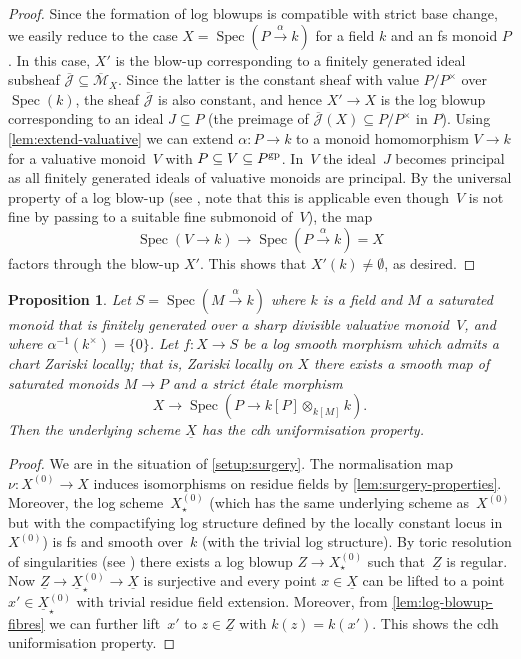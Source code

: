 \documentclass[a4paper,twoside,11pt,reqno]{amsart}
\newcommand{\cM}{{\mathcal M}}
\newcommand{\la}{\longrightarrow}
\DeclareMathOperator{\Spec}{Spec}
\newcommand{\gp}{{\rm gp}}
\newtheorem{prop}[thm]{Proposition}
\theoremstyle{definition}
\numberwithin{equation}{subsection}
\begin{document}
\begin{proof}
Since the formation of log blowups is compatible with strict base change, we easily reduce to the case $X = \Spec(P\xrightarrow{\alpha} k)$ for a field $k$ and an fs monoid $P$. In this case, $X'$ is the blow-up corresponding to a finitely generated ideal subsheaf  $\overline{\mathcal{J}}\subseteq \overline{\cM}_X$. Since the latter is the constant sheaf with value $P/P^\times$ over $\Spec(k)$, the sheaf $\overline{\mathcal{J}}$ is also constant, and hence $X'\to X$ is the log blowup corresponding to an ideal $J\subseteq P$ (the preimage of $\overline{\mathcal{J}}(X)\subseteq P/P^\times$ in $P$). Using \cref{lem:extend-valuative} we can extend $\alpha \colon P \to k$ to a monoid homomorphism $V \to k$ for a valuative monoid~$V$ with $P \subseteq V \subseteq P^\gp$.
In~$V$ the ideal~$J$ becomes principal as all finitely generated ideals of valuative monoids are principal.
By the universal property of a log blow-up (see \cite[Definition~III.2.6.2]{Ogus}, note that this is applicable even though~$V$ is not fine by passing to a suitable fine submonoid of~$V$), the map
\[ 
    \Spec(V\to k) \longrightarrow \Spec(P\xrightarrow{\alpha}k) = X
\]
factors through the blow-up $X'$. This shows that $X'(k)\neq \emptyset$, as desired.
\end{proof}

\begin{prop} \label{lem:log-sm-cdh-unif}
    Let $S = \Spec(M\xrightarrow{\alpha} k)$ where $k$ is a field and $M$ a saturated monoid that is finitely generated over a sharp divisible valuative monoid~$V$, and where $\alpha^{-1}(k^\times)=\{0\}$.
    Let $f\colon X\to S$ be a log smooth morphism which admits a chart Zariski locally; that is, Zariski locally on $X$ there exists a smooth map of saturated monoids $M\to P$ and a strict \'etale morphism
    \[
        X \la \Spec(P\to k[P] \otimes_{k[M]} k).
    \]
    Then the underlying scheme $\underline{X}$ has the cdh uniformisation property.
\end{prop}

\begin{proof}
We are in the situation of \cref{setup:surgery}.
The normalisation map $\nu \colon X^{(0)} \to X$ induces isomorphisms on residue fields by \cref{lem:surgery-properties}.
Moreover, the log scheme~$X_\star^{(0)}$ (which has the same underlying scheme as~$X^{(0)}$ but with the compactifying log structure defined by the locally constant locus in~$X^{(0)}$) is fs and smooth over~$k$ (with the trivial log structure).
By toric resolution of singularities (see \cite[(10.4)]{KatoToricSingularities}) there exists a log blowup $Z \to X_\star^{(0)}$ such that~$\underline{Z}$ is regular.
Now $\underline{Z} \to \underline{X}_\star^{(0)} \to \underline{X}$ is surjective and every point $x \in \underline{X}$ can be lifted to a point $x' \in \underline{X}_\star^{(0)}$ with trivial residue field extension.
Moreover, from \cref{lem:log-blowup-fibres} we can further lift~$x'$ to $z\in \underline{Z}$  with $k(z)=k(x')$.
This shows the cdh uniformisation property.
\end{proof}
\end{document}
